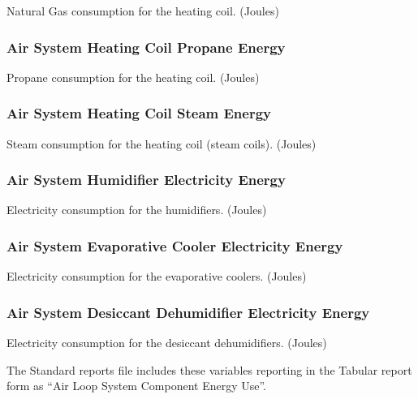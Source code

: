 Natural Gas consumption for the heating coil. (Joules)

\subsubsection{Air System Heating Coil Propane Energy}\label{air-system-heating-coil-propane-energy}

Propane consumption for the heating coil. (Joules)

\subsubsection{Air System Heating Coil Steam Energy}\label{air-system-heating-coil-steam-energy}

Steam consumption for the heating coil (steam coils). (Joules)

\subsubsection{Air System Humidifier Electricity Energy}\label{air-system-humidifier-electric-energy}

Electricity consumption for the humidifiers. (Joules)

\subsubsection{Air System Evaporative Cooler Electricity Energy}\label{air-system-evaporative-cooler-electric-energy}

Electricity consumption for the evaporative coolers. (Joules)

\subsubsection{Air System Desiccant Dehumidifier Electricity Energy}\label{air-system-desiccant-dehumidifier-electric-energy}

Electricity consumption for the desiccant dehumidifiers. (Joules)

The Standard reports file includes these variables reporting in the Tabular report form as ``Air Loop System Component Energy Use''.

